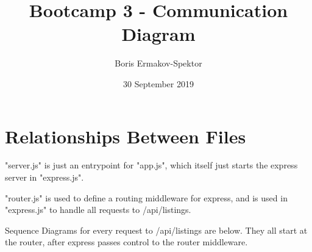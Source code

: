 \documentclass[notitlepage]{article}
\begin{document}
\title{Bootcamp 3 - Communication Diagram}
\author{Boris Ermakov-Spektor}
\date{30 September 2019}

\maketitle

\tableofcontents

\newpage

\section{Relationships Between Files}

	\par "server.js" is just an entrypoint for "app.js", which itself
	just starts the express server in "express.js".

	\par "router.js" is used to define a routing middleware for
	express, and is used in "express.js" to handle all
	requests to /api/listings.

	\par Sequence Diagrams for every request to /api/listings are below.
	They all start at the router, after express passes control to
	the router middleware.
\end{document}
